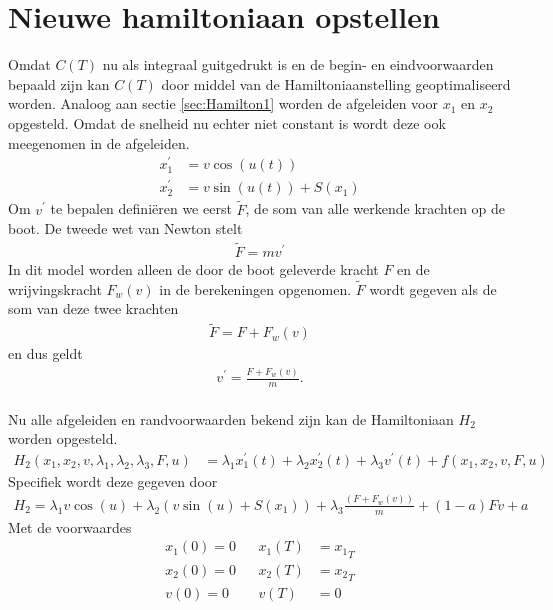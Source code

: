 \section{Nieuwe hamiltoniaan opstellen}
Omdat \(C(T)\) nu als integraal guitgedrukt is en de begin- en eindvoorwaarden bepaald zijn kan \(C(T)\) door middel van de Hamiltoniaanstelling geoptimaliseerd worden. Analoog aan sectie \ref{sec:Hamilton1} worden de afgeleiden voor \(x_1\) en \(x_2\) opgesteld. Omdat de snelheid nu echter niet constant is wordt deze ook meegenomen in de afgeleiden.
\begin{align}
	x_1^\prime &= v \cos(u(t)) \label{eq:x1'kosten}\\ 
 	x_2^\prime &= v \sin(u(t)) + S(x_1)\label{eq:x2'kosten}
\end{align}
Om \(v^\prime\) te bepalen defini\"eren we eerst \(\widetilde{F}\), de som van alle werkende krachten op de boot. De tweede wet van Newton stelt
\begin{align*}
	\widetilde{F} = m v^\prime
\end{align*}
In dit model worden alleen de door de boot geleverde kracht \(F\) en de wrijvingskracht \(F_w(v)\) in de berekeningen opgenomen. \(\widetilde{F}\) wordt gegeven als de som van deze twee krachten
\begin{align*}
	\widetilde{F}= F+ F_w(v)
\end{align*}
en dus geldt
\begin{align}
v^\prime   = \frac{F + F_w(v)}{m}. \label{eq:v'}
\end{align}\\
Nu alle afgeleiden en randvoorwaarden bekend zijn kan de Hamiltoniaan \(H_2\) worden opgesteld.
\begin{align*}
	H_2(x_1,x_2,v,\lambda_1,\lambda_2,\lambda_3,F,u) &= \lambda_1  x_1^\prime(t) + \lambda_2 x_2^\prime(t)+ \lambda_3 v^\prime(t) + f(x_1,x_2,v,F,u)
\end{align*}
Specifiek wordt deze gegeven door
\begin{align*}
H_2 = \lambda_1v\cos(u)+\lambda_2(v\sin(u)+ S(x_1)) + \lambda_3\frac{(F+F_w (v))}{m} + (1-a)Fv + a
\end{align*}
Met de voorwaardes
\begin{align*}
	x_1(0) = 0 && x_1(T) &= {x_1}_T\\
	x_2(0) = 0 && x_2(T) &= {x_2}_T\\
	v(0) = 0 && v(T) &= 0
\end{align*}

